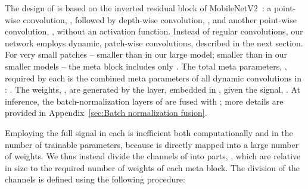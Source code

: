 \documentclass[final]{cvpr}
\begin{document}
\begin{table}[t!]
\begin{center}
\end{center}
\caption{\emph{Results on the PASCAL VOC 2012, val. set~\cite{everingham2010pascal}.} '', represents metrics that were computed by us using open source (listed in Appendix~\ref{sec:Open source repositories}).}
\label{tab:pascal_voc_val_quant}
\end{table}




The design of  is based on the inverted residual block of MobileNetV2~\cite{sandler2018mobilenetv2}: a point-wise convolution, , followed by depth-wise convolution, , and another point-wise convolution, , without an activation function. Instead of regular convolutions, our network employs dynamic, patch-wise convolutions, described in the next section. For very small patches -- smaller than  in our large model; smaller than  in our smaller models -- the meta block includes only . The total meta parameters,
, required by each  is the combined meta parameters of all dynamic convolutions in :
. The weights, , are generated by the  layer, embedded in , given the signal, . At inference, the batch-normalization layers of  are fused with ; more details are provided in Appendix~\ref{sec:Batch normalization fusion}.

Employing the full signal in each  is inefficient both computationally and in the number of trainable parameters, because  is directly mapped into a large number of weights. We thus instead divide the channels of  into parts, , which are relative in size to the required number of weights of each meta block. The division of the channels is defined using the following procedure:
\end{document}
